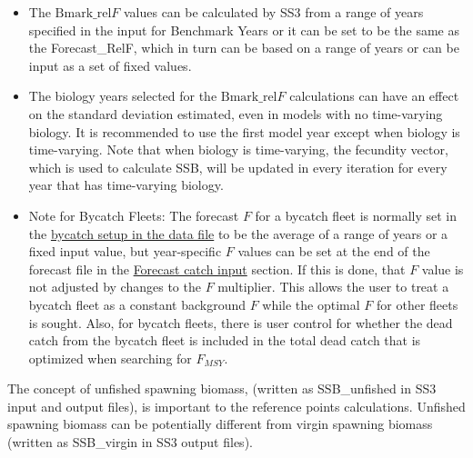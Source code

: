 \begin{itemize}
	\item The $\text{Bmark\_rel}F$ values can be calculated by SS3 from a range of years specified in the input for Benchmark Years or it can be set to be the same as the Forecast\_RelF, which in turn can be based on a range of years or can be input as a set of fixed values.
	
	\item The biology years selected for the $\text{Bmark\_rel}F$ calculations can have an effect on the standard deviation estimated, even in models with no time-varying biology. It is recommended to use the first model year except when biology is time-varying. Note that when biology is time-varying, the fecundity vector, which is used to calculate SSB, will be updated in every iteration for every year that has time-varying biology.
	
	\item Note for Bycatch Fleets: The forecast $F$ for a bycatch fleet is normally set in the \hyperlink{BycatchFleets}{bycatch setup in the data file} to be the average of a range of years or a fixed input value, but year-specific $F$ values can be set at the end of the forecast file in the \hyperlink{ForecastCatchInput}{Forecast catch input} section. If this is done, that $F$ value is not adjusted by changes to the $F$ multiplier. This allows the user to treat a bycatch fleet as a constant background $F$ while the optimal $F$ for other fleets is sought. Also, for bycatch fleets, there is user control for whether the dead catch from the bycatch fleet is included in the total dead catch that is optimized when searching for $F_{MSY}$.
  
\end{itemize}

The concept of unfished spawning biomass, (written as SSB\_unfished in SS3 input and output files), is important to the reference points calculations. Unfished spawning biomass can be potentially different from virgin spawning biomass (written as SSB\_virgin in SS3 output files).

